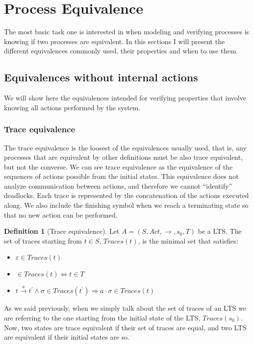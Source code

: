 \documentclass[11pt]{article}
\newcommand{\cmark}{\ding{51}}
\theoremstyle{definition}
\newtheorem{definition}{Definition}
\theoremstyle{plain}
\begin{document}
\section{Process Equivalence}
The most basic task one is interested in when modeling and verifying processes is knowing if two processes are equivalent. In this sections I will present the different equivalences commonly used, their properties and when to use them.
\subsection{Equivalences without internal actions}
We will show here the equivalences intended for verifying properties that involve knowing all actions performed by the system.
\subsubsection{Trace equivalence} 
The trace equivalence is the loosest of the equivalences usually used, that is, any processes that are equivalent by other definitions must be also trace equivalent, but not the converse. We can see trace equivalence as the equivalence of the sequences of actions possible from the initial states. This equivalence does not analyze communication between actions, and therefore we cannot ``identify'' deadlocks. Each trace is represented by the concatenation of the actions executed along. We also include the finishing symbol when we reach a terminating state so that no new action can be performed.
\begin{definition} [Trace equivalence]
	Let $ A = (S, Act, \rightarrow, s_0, T) $ be a LTS. The set of traces starting from $ t \in S$, $ Traces(t) $, is the minimal set that satisfies:
	\begin{itemize}
		\item $ \varepsilon \in Traces(t) $
		\item \cmark $ \in Traces(t) \iff t \in T $
		\item $ t\xrightarrow{a} t^\prime  \wedge \sigma \in Traces(t^\prime ) \Rightarrow a\cdot\sigma \in Traces(t) $
	\end{itemize}
\end{definition}

As we said previously, when we simply talk about the set of traces of an LTS we are referring to the one starting from the initial state of the LTS, $ Traces(s_0) $. Now, two states are trace equivalent if their set of traces are equal, and two LTS are equivalent if their initial states are so. 
\end{document}
